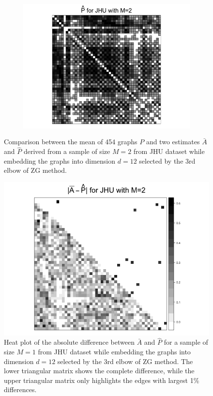 \documentclass[a4paper]{article}
\begin{document}
\begin{figure}
\begin{subfigure}{.33\textwidth}
  \includegraphics[width=1.2\linewidth]{Phat_JHU_m2.png}
\end{subfigure}
\caption{Comparison between the mean of 454 graphs $P$ and two estimates $\bar{A}$ and $\hat{P}$ derived from a sample of size $M=2$ from JHU dataset while embedding the graphs into dimension $d=12$ selected by the 3rd elbow of ZG method.}
\label{fig:adj_JHU_m2}
\end{figure}

\begin{figure}[!htb]
\centering
\includegraphics[width=1\textwidth]{Diff_JHU_m2.png}
\caption{Heat plot of the absolute difference between $\bar{A}$ and $\hat{P}$ for a sample of size $M=1$ from JHU dataset while embedding the graphs into dimension $d=12$ selected by the 3rd elbow of ZG method. The lower triangular matrix shows the complete difference, while the upper triangular matrix only highlights the edges with largest 1\% differences.}
\label{fig:Diff_JHU_m2}
\end{figure}
\end{document}

